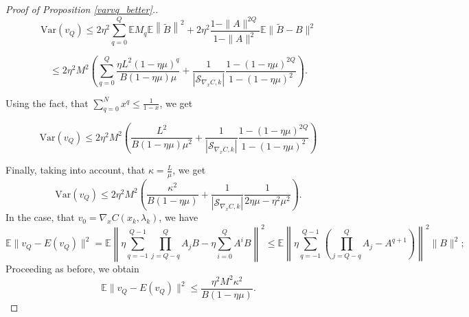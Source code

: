 \documentclass[11pt, twoside]{report}
\begin{document}
\begin{proof}[Proof of Proposition \ref{varvq_better}.]
\[\mathrm{Var}(v_Q) \leq 2 \eta^2 \sum_{q=0}^{Q} \mathbb{E} M_q \mathbb{E} \left\| \tilde{B} \right\|^2 + 2\eta^2 \frac{1-\|A\|^{2Q}}{1-\|A\|^2} \mathbb{E} \|\tilde{B} - B\|^2\]

\[\leq 2 \eta^2M^2 \left( \sum_{q=0}^{Q} \frac{\eta L^2 (1-\eta\mu)^{q}}{B(1-\eta\mu)\mu} + \frac{1}{|\mathcal{S}_{\nabla_x C,k}|}\frac{1-(1-\eta\mu)^{2Q}}{1-(1-\eta\mu)^2} \right).\]

Using the fact, that $\sum_{q=0}^N x^q \leq \frac{1}{1-x}$, we get

\[ \mathrm{Var}(v_Q) \leq  2 \eta^2M^2 \left( \frac{ L^2 }{B(1-\eta\mu)\mu^2} + \frac{1}{|\mathcal{S}_{\nabla_x C,k}|}\frac{1-(1-\eta\mu)^{2Q}}{1-(1-\eta\mu)^2} \right)\]


Finally, taking into account, that $\kappa = \frac{L}{\mu}$, we get
\[\mathrm{Var}(v_Q) \leq 2 \eta^2M^2 \left( \frac{ \kappa^2 }{B(1-\eta\mu)} + \frac{1}{|\mathcal{S}_{\nabla_x C,k}|}\frac{1}{2\eta \mu - \eta^2 \mu^2} \right).\]
In the case, that $v_0 = \nabla_x C(x_k,\lambda_k)$, we have
\[\mathbb{E}\|v_Q - E(v_Q)\|^2 = \mathbb{E} \left\|\eta \sum_{q=-1}^{Q-1} \prod_{j = Q-q}^Q A_jB - \eta \sum_{i=0}^Q A^i B \right\|^2 \leq \mathbb{E} \left\|\eta \sum_{q=-1}^{Q-1} \left( \prod_{j = Q-q}^Q A_j - A^{q+1} \right) \right\|^2 \|B\|^2;\]
Proceeding as before, we obtain
\[\mathbb{E}\|v_Q - E(v_Q)\|^2 \leq \frac{\eta^2M^2 \kappa^2 }{B(1-\eta\mu)}.\]
\end{proof}
\end{document}
